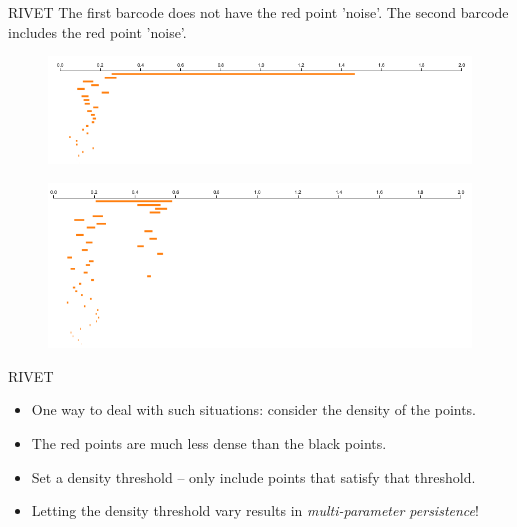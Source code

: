 \begin{frame}{RIVET}
The first barcode does not have the red point 'noise'.  The second barcode includes the red point 'noise'.

\begin{figure}
\centering
\includegraphics[scale=0.5]{images/data3rip.png}
\end{figure} 

\begin{figure}
\centering
\includegraphics[scale=0.5]{images/data7rip.png}
\end{figure} 
\end{frame}
\begin{frame}{RIVET}
\begin{itemize}
\item<1-> One way to deal with such situations: consider the density of the points.
\item<2-> The red points are much less dense than the black points.
\item<3-> Set a density threshold -- only include points that satisfy that threshold.
\item<4-> Letting the density threshold vary results in \textit{multi-parameter persistence}!
\end{itemize}
\begin{figure}
\end{figure} 
\end{frame}
